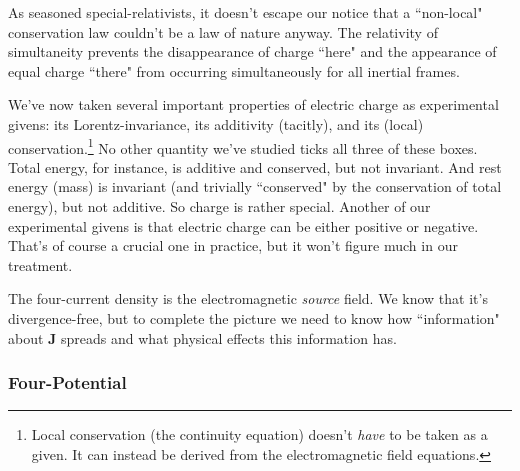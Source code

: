 \documentclass[12pt]{article}
\renewcommand{\vv}[1]{\mathbf{#1}}
\begin{document}
As seasoned special-relativists, it doesn't escape our notice that a ``non-local" conservation law couldn't be a law of nature anyway. The relativity of simultaneity prevents the disappearance of charge ``here" and the appearance of equal charge ``there" from occurring simultaneously for all inertial frames.

We've now taken several important properties of electric charge as experimental givens: its Lorentz-invariance, its additivity (tacitly), and its (local) conservation.\footnote{Local conservation (the continuity equation) doesn't \emph{have} to be taken as a given. It can instead be derived from the electromagnetic field equations.} No other quantity we've studied ticks all three of these boxes. Total energy, for instance, is additive and conserved, but not invariant. And rest energy (mass) is invariant (and trivially ``conserved" by the conservation of total energy), but not additive. So charge is rather special. Another of our experimental givens is that electric charge can be either positive or negative. That's of course a crucial one in practice, but it won't figure much in our treatment.

The four-current density is the electromagnetic \emph{source} field. We know that it's divergence-free, but to complete the picture we need to know how ``information" about $\vv J$ spreads and what physical effects this information has.


\subsubsection{Four-Potential}\label{sssec:fp}
\end{document}
